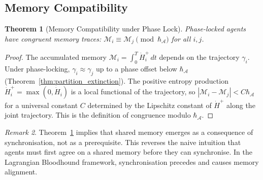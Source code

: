 \documentclass[twocolumn,11pt,a4paper]{article}
\theoremstyle{plain}
\newtheorem{theorem}{Theorem}[section]
\theoremstyle{definition}
\theoremstyle{remark}
\newtheorem{remark}[theorem]{Remark}
\newcommand{\Hplus}{\dot{H}^{+}}
\newcommand{\abs}[1]{\left|#1\right|}
\begin{document}
\subsection{Memory Compatibility}

\begin{theorem}[Memory Compatibility under Phase Lock]
\label{thm:memory_compat}
Phase-locked agents have congruent memory traces: $\mathcal{M}_i \equiv \mathcal{M}_j \pmod{\hbar_{\mathcal{A}}}$ for all $i,j$.
\end{theorem}

\begin{proof}
The accumulated memory $\mathcal{M}_i = \int_0^T \Hplus_i\,dt$ depends on the trajectory $\gamma_i$.  Under phase-locking, $\gamma_i \approx \gamma_j$ up to a phase offset below $\hbar_{\mathcal{A}}$ (Theorem~\ref{thm:partition_extinction}).  The positive entropy production $\Hplus_i = \max(0,\dot{H}_i)$ is a local functional of the trajectory, so $\abs{\mathcal{M}_i - \mathcal{M}_j} < C\hbar_{\mathcal{A}}$ for a universal constant $C$ determined by the Lipschitz constant of $\Hplus$ along the joint trajectory.  This is the definition of congruence modulo $\hbar_{\mathcal{A}}$.
\end{proof}

\begin{remark}
Theorem~\ref{thm:memory_compat} implies that shared memory emerges as a consequence of synchronisation, not as a prerequisite.  This reverses the naive intuition that agents must first agree on a shared memory before they can synchronise.  In the Lagrangian Bloodhound framework, synchronisation precedes and causes memory alignment.
\end{remark}
\end{document}
